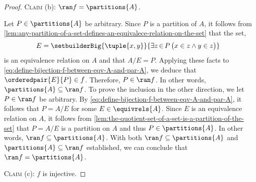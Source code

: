 \begin{proof}
    \vspace{0.5cm}
    \noindent
    {\scshape Claim} (b): \( \ran f = \partitions{A} \).

    \vspace{0.2cm}
    \noindent
    Let \( P \in \partitions{A} \) be arbitrary. Since \( P \) is a partition of \( A \),
    it follows from \cref{lem:any-partition-of-a-set-defines-an-equivalece-relation-on-the-set}
    that the set,
    \begin{equation*}
        E = \setbuilderBig{\tuple{x,y}}{\exists z\,{\in}\,P \, \big( x \in z \land y \in z \big)}
    \end{equation*}
    is an equivalence relation on \( A \) and that \( A / E = P \). Applying these facts to \eqref{eq:define-bijection-f-between-eqv-A-and-par-A},
    we deduce that \( \orderedpair{E}{P} \in f \). Therefore, \( P \in \ran f \). In other words, \( \partitions{A} \subseteq \ran f \).
    To prove the inclusion in the other direction, we let \( P \in \ran f \) be arbitrary. By \eqref{eq:define-bijection-f-between-eqv-A-and-par-A}, it follows
    that \( P = A / E \) for some \( E \in \equivrels{A} \). Since \( E \) is an equivalence relation on \( A \), it follows from
    \cref{lem:the-quotient-set-of-a-set-is-a-partition-of-the-set} that \( P = A / E \) is a partition on \( A \) and thus \( P \in \partitions{A} \).
    In other words, \( \ran f \subseteq \partitions{A} \). With both \( \ran f \subseteq \partitions{A} \) and \( \partitions{A} \subseteq \ran f \)
    established, we can conclude that \( \ran f = \partitions{A} \).

    \vspace{0.5cm}
    \noindent
    {\scshape Claim} (c): \( f \) is injective.


\end{proof}
